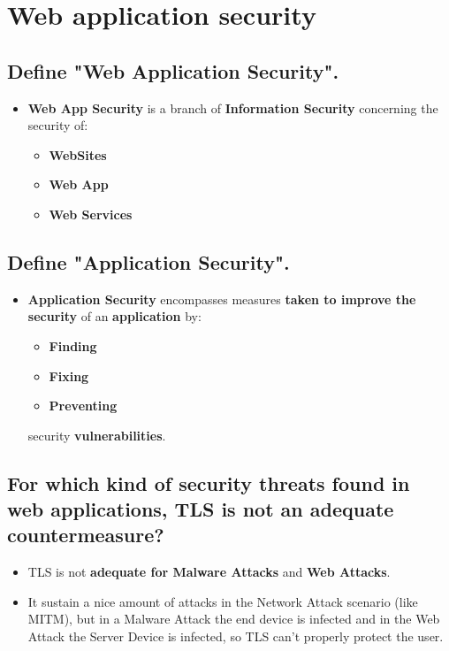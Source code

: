 \documentclass[9pt, letterpaper]{article}
\begin{document}
\newpage

\section{Web application security}

\subsection{Define "Web Application Security".}
\begin{itemize}
	\item \textbf{Web App Security} is a branch of \textbf{Information Security} concerning the security of:
	\begin{itemize}
		\item \textbf{WebSites}
		\item \textbf{Web App}
		\item \textbf{Web Services}
	\end{itemize}
\end{itemize}

\subsection{Define "Application Security".}
\begin{itemize}
	\item \textbf{Application Security} encompasses measures \textbf{taken to improve the security} of an \textbf{application} by:
	\begin{itemize}
		\item \textbf{Finding}
		\item \textbf{Fixing}
		\item \textbf{Preventing}
	\end{itemize}
	security \textbf{vulnerabilities}.
\end{itemize}

\subsection{For which kind of security threats found in web applications, TLS is not an adequate countermeasure?}
\begin{itemize}
	\item TLS is not \textbf{adequate for Malware Attacks} and \textbf{Web Attacks}. 
	\item It sustain a nice amount of attacks in the Network Attack scenario (like MITM), but in a Malware Attack the end device is infected and in the Web Attack the Server Device is infected, so TLS can't properly protect the user.
\end{itemize}
\end{document}
